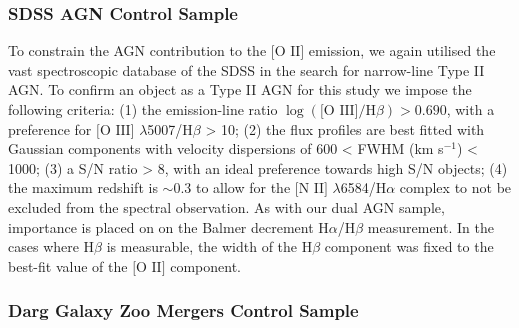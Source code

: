 \subsubsection{SDSS AGN Control Sample}

To constrain the AGN contribution to the $\text{[O II]}$ emission, we again utilised the vast spectroscopic database of the SDSS in the search for narrow-line Type II AGN. To confirm an object as a Type II AGN for this study we impose the following criteria: (1) the emission-line ratio $\log(\text{[O III]}/\text{H}\beta)>{0.690}$, with a preference for $\text{[O III]}$ $\lambda$5007/$\text{H}\beta$ > 10; (2) the flux profiles are best fitted with Gaussian components with velocity dispersions of 600 < FWHM (km s$^{-1}$) < 1000; (3) a S/N ratio > 8, with an ideal preference towards high S/N objects; (4) the maximum redshift is $\sim{0.3}$ to allow for the $\text{[N II]}$ $\lambda$6584/$\text{H}\alpha$ complex to not be excluded from the spectral observation. As with our dual AGN sample, importance is placed on on the Balmer decrement $\text{H}\alpha$/$\text{H}\beta$ measurement. In the cases where $\text{H}\beta$ is measurable, the width of the $\text{H}\beta$ component was fixed to the best-fit value of the $\text{[O II]}$ component.

\subsubsection{Darg Galaxy Zoo Mergers Control Sample}

